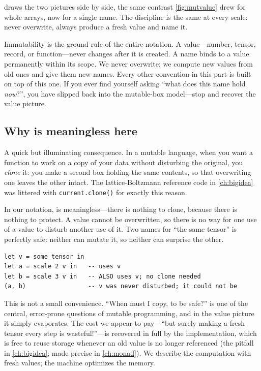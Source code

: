 draws the two pictures side by side, the same contrast
\cref{fig:mutvalue} drew for whole arrays, now for a single name. The discipline
is the same at every scale: never overwrite, always produce a fresh value and
name it.

\begin{keyidea}
Immutability is the ground rule of the entire notation. A value---number, tensor,
record, or function---never changes after it is created. A name binds to a value
permanently within its scope. We never overwrite; we compute new values from old
ones and give them new names. Every other convention in this part is built on
top of this one. If you ever find yourself asking ``what does this name hold
\emph{now}?'', you have slipped back into the mutable-box model---stop and
recover the value picture.
\end{keyidea}

\subsection{Why  is meaningless here}

A quick but illuminating consequence. In a mutable language, when you want a
function to work on a copy of your data without disturbing the original, you
\emph{clone} it: you make a second box holding the same contents, so that
overwriting one leaves the other intact. The lattice-Boltzmann reference code in
\cref{ch:bigidea} was littered with \texttt{current.clone()} for exactly this
reason.

In our notation,  is meaningless---there is nothing to clone,
because there is nothing to protect. A value cannot be overwritten, so there is no
way for one use of a value to disturb another use of it. Two names for ``the same
tensor'' is perfectly safe: neither can mutate it, so neither can surprise the
other.

\begin{lstlisting}[style=l4style]
let v = some_tensor in
let a = scale 2 v in   -- uses v
let b = scale 3 v in   -- ALSO uses v; no clone needed
(a, b)                 -- v was never disturbed; it could not be
\end{lstlisting}

\noindent This is not a small convenience. ``When must I copy, to be safe?'' is
one of the central, error-prone questions of mutable programming, and in the
value picture it simply evaporates. The cost we appear to pay---``but surely
making a fresh tensor every step is wasteful!''---is recovered in full by the
implementation, which is free to reuse storage whenever an old value is no longer
referenced (the pitfall in \cref{ch:bigidea}; made precise in \cref{ch:monad}).
We describe the computation with fresh values; the machine optimizes the memory.

